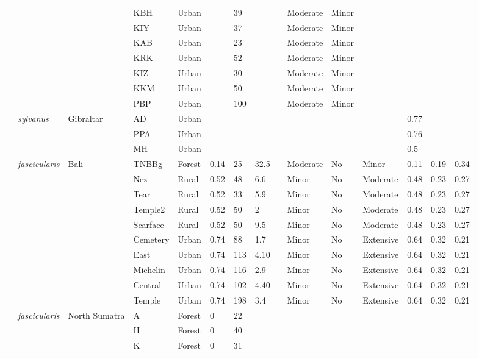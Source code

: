 \documentclass[american]{../../../coursework}
\begin{document}
\begin{landscape}
\begin{longtabu}{X[L,2]X[1.1]XX[1.25]XXXXXXXX[0.75]X[0.5]XX}
            &  &  & KBH & Urban &  & 39 &  &  & Moderate & Minor &  &  &  &  \\
            &  &  & KIY & Urban &  & 37 &  &  & Moderate & Minor &  &  &  &  \\
            &  &  & KAB & Urban &  & 23 &  &  & Moderate & Minor &  &  &  &  \\
            &  &  & KRK & Urban &  & 52 &  &  & Moderate & Minor &  &  &  &  \\
            &  &  & KIZ & Urban &  & 30 &  &  & Moderate & Minor &  &  &  &  \\
            &  &  & KKM & Urban &  & 50 &  &  & Moderate & Minor &  &  &  &  \\
            &  &  & PBP & Urban &  & 100 &  &  & Moderate & Minor &  &  &  &  \\
         \textcite{Sch121} & \textit{sylvanus} & Gibraltar & AD & Urban &  &  &  &  &  &  &  & 0.77 &  &  \\
            &  &  & PPA & Urban &  &  &  &  &  &  &  & 0.76 &  &  \\
            &  &  & MH & Urban &  &  &  &  &  &  &  & 0.5 &  &  \\
         \textcite{Beh14} & \textit{fascicularis} & Bali & TNBBg & Forest & 0.14 & 25 & 32.5 &  & Moderate & No & Minor & 0.11 & 0.19 & 0.34 \\
            &  &  & Nez & Rural & 0.52 & 48 & 6.6 &  & Minor & No & Moderate & 0.48 & 0.23 & 0.27 \\
            &  &  & Tear & Rural & 0.52 & 33 & 5.9 &  & Minor & No & Moderate & 0.48 & 0.23 & 0.27 \\
            &  &  & Temple2 & Rural & 0.52 & 50 & 2 &  & Minor & No & Moderate & 0.48 & 0.23 & 0.27 \\
            &  &  & Scarface & Rural & 0.52 & 50 & 9.5 &  & Minor & No & Moderate & 0.48 & 0.23 & 0.27 \\
            &  &  & Cemetery & Urban & 0.74 & 88 & 1.7 &  & Minor & No & Extensive & 0.64 & 0.32 & 0.21 \\
            &  &  & East & Urban & 0.74 & 113 & 4.10 &  & Minor & No & Extensive & 0.64 & 0.32 & 0.21 \\
            &  &  & Michelin & Urban & 0.74 & 116 & 2.9 &  & Minor & No & Extensive & 0.64 & 0.32 & 0.21 \\
            &  &  & Central & Urban & 0.74 & 102 & 4.40 &  & Minor & No & Extensive & 0.64 & 0.32 & 0.21 \\
            &  &  & Temple & Urban & 0.74 & 198 & 3.4 &  & Minor & No & Extensive & 0.64 & 0.32 & 0.21 \\
         \textcite{van99} & \textit{fascicularis} & North Sumatra & A & Forest & 0 & 22 &  &  &  &  &  &  &  &  \\
            &  &  & H & Forest & 0 & 40 &  &  &  &  &  &  &  &  \\
            &  &  & K & Forest & 0 & 31 &  &  &  &  &  &  &  &  \\
        \bottomrule
    \end{longtabu}
\end{landscape}
\end{document}
